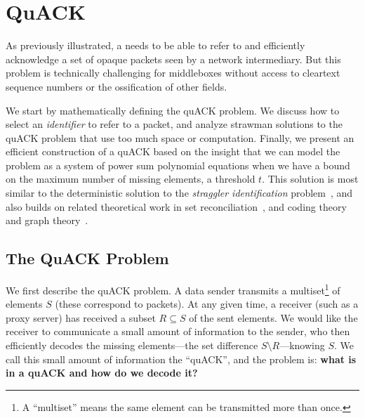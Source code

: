 \section{QuACK}
\label{sec:quack}

As previously illustrated, a \sys needs to be able to refer to and efficiently
acknowledge a set of opaque packets seen by a network intermediary.
But this problem is technically challenging for middleboxes without access to
cleartext sequence numbers or the ossification of other fields.

We start by mathematically defining the quACK problem.
We discuss how to select an \emph{identifier} to refer to a packet,
and analyze strawman solutions to the quACK problem
that use too much space or computation.
Finally, we present an efficient construction of a quACK based on the insight
that we can model the problem as a system of power sum polynomial equations
when we have a bound on the maximum number of missing elements, a threshold $t$.
This solution is most similar to the deterministic solution to the
\emph{straggler identification} problem~\cite{eppstein2011straggler}, and also builds on
related theoretical work in set reconciliation~\cite{minsky2003set}, and coding
theory and graph theory~\cite{karpovsky2003data}.

\subsection{The QuACK Problem}

We first describe the quACK problem. A data sender transmits a multiset\footnote{A ``multiset'' means the same element can be transmitted more than once.} of elements $S$ (these correspond to packets).
At any given time, a receiver (such as a proxy server) has received a subset
$R \subseteq S$ of the sent elements.
We would like the receiver to
communicate a small amount of information
to the sender,
who then efficiently decodes the missing elements---the set difference
$S \setminus R$---knowing $S$.
We call this small amount of information the ``quACK'', and the problem is:
\textbf{what is in a quACK and how do we decode it?}

